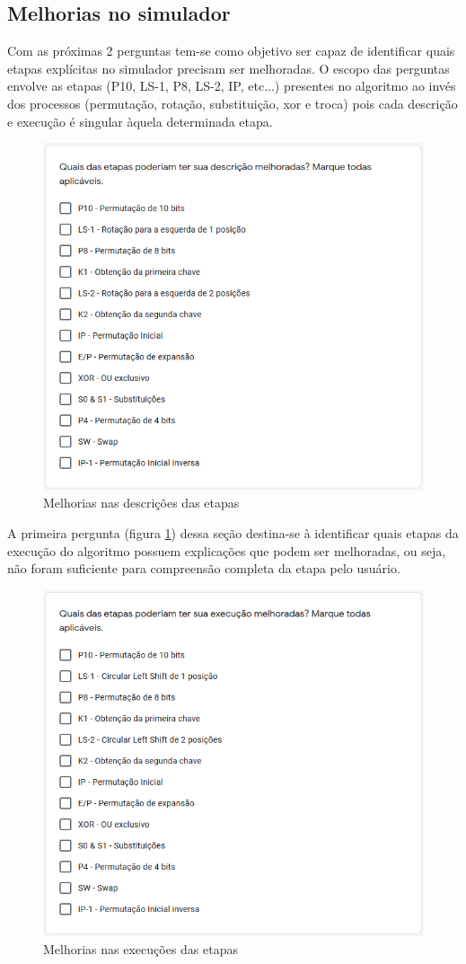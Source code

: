 \subsection{Melhorias no simulador}

Com as próximas 2 perguntas tem-se como objetivo ser capaz de identificar quais etapas explícitas no simulador precisam ser melhoradas. O escopo das perguntas envolve as etapas (P10, LS-1, P8, LS-2, IP, etc...) presentes no algoritmo ao invés dos processos (permutação, rotação, substituição, xor e troca) pois cada descrição e execução é singular àquela determinada etapa.

\begin{figure}[H]
    \centering
    \caption{Melhorias nas descrições das etapas}
    \label{fig:melhoriadescricoes}
    \includegraphics[width=0.7\linewidth]{Questionario/Q5.png}
\end{figure}

A primeira pergunta (figura \ref{fig:melhoriadescricoes}) dessa seção destina-se à identificar quais etapas da execução do algoritmo possuem explicações que podem ser melhoradas, ou seja, não foram suficiente para compreensão completa da etapa pelo usuário.

\begin{figure}[H]
    \centering
    \caption{Melhorias nas execuções das etapas}
    \label{fig:melhoriaexecucoes}
    \includegraphics[width=0.7\linewidth]{Questionario/Q6.png}
\end{figure}


